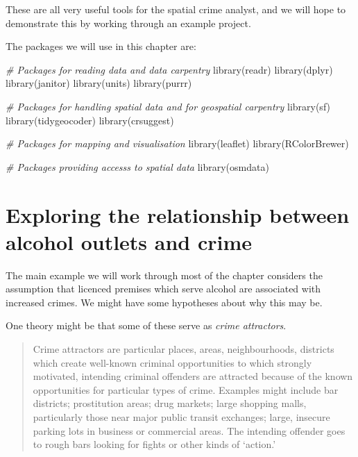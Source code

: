 \documentclass[
  krantz2]{krantz}
\makeatletter
\newenvironment{Shaded}{\begin{snugshade}}{\end{snugshade}}
\newcommand{\CommentTok}[1]{\textcolor[rgb]{0.37,0.37,0.37}{\textit{#1}}}
\newcommand{\FunctionTok}[1]{\textcolor[rgb]{0,0,0}{#1}}
\newcommand{\NormalTok}[1]{#1}
\newenvironment{kframe}{%
\medskip{}
\setlength{\fboxsep}{.8em}
 \def\at@end@of@kframe{}%
 \ifinner\ifhmode%
  \def\at@end@of@kframe{\end{minipage}}%
  \begin{minipage}{\columnwidth}%
 \fi\fi%
 \def\FrameCommand##1{\hskip\@totalleftmargin \hskip-\fboxsep
 \colorbox{shadecolor}{##1}\hskip-\fboxsep
     \hskip-\linewidth \hskip-\@totalleftmargin \hskip\columnwidth}%
 \MakeFramed {\advance\hsize-\width
   \@totalleftmargin\z@ \linewidth\hsize
   \@setminipage}}%
 {\par\unskip\endMakeFramed%
 \at@end@of@kframe}
\renewenvironment{Shaded}{\begin{kframe}}{\end{kframe}}
\makeatother
\begin{document}
These are all very useful tools for the spatial crime analyst, and we will hope to demonstrate this by working through an example project.

The packages we will use in this chapter are:

\begin{Shaded}
\begin{Highlighting}[]
\CommentTok{\# Packages for reading data and data carpentry}
\FunctionTok{library}\NormalTok{(readr)}
\FunctionTok{library}\NormalTok{(dplyr)}
\FunctionTok{library}\NormalTok{(janitor)}
\FunctionTok{library}\NormalTok{(units)}
\FunctionTok{library}\NormalTok{(purrr)}

\CommentTok{\# Packages for handling spatial data and for geospatial carpentry}
\FunctionTok{library}\NormalTok{(sf)}
\FunctionTok{library}\NormalTok{(tidygeocoder)}
\FunctionTok{library}\NormalTok{(crsuggest)}

\CommentTok{\# Packages for mapping and visualisation}
\FunctionTok{library}\NormalTok{(leaflet)}
\FunctionTok{library}\NormalTok{(RColorBrewer)}

\CommentTok{\# Packages providing accesss to spatial data}
\FunctionTok{library}\NormalTok{(osmdata)}
\end{Highlighting}
\end{Shaded}

\hypertarget{exploring-the-relationship-between-alcohol-outlets-and-crime}{%
\section{Exploring the relationship between alcohol outlets and crime}\label{exploring-the-relationship-between-alcohol-outlets-and-crime}}

The main example we will work through most of the chapter considers the assumption that licenced premises which serve alcohol are associated with increased crimes. We might have some hypotheses about why this may be.

One theory might be that some of these serve as \emph{crime attractors}.

\begin{quote}
Crime attractors are particular places, areas, neighbourhoods, districts which create well-known criminal opportunities to which strongly motivated, intending criminal offenders are attracted because of the known opportunities for particular types of crime. Examples might include bar districts; prostitution areas; drug markets; large shopping malls, particularly those near major public transit exchanges; large, insecure parking lots in business or commercial areas. The intending offender goes to rough bars looking for fights or other kinds of `action.'
\end{quote}
\end{document}
